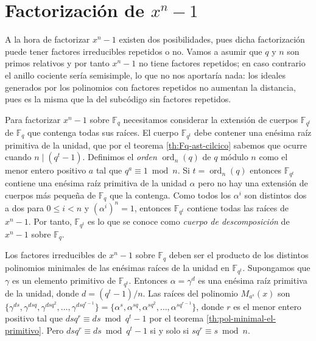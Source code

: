 \section{Factorización de \texorpdfstring{\(x^n -1\)}{xn - 1}}

\label{sec:factorizacion-xn-1}

A la hora de factorizar \(x^n -1\) existen dos posibilidades, pues dicha factorización puede tener factores irreducibles repetidos o no.
Vamos a asumir que \(q\) y \(n\) son primos relativos y por tanto \(x^n - 1\) no tiene factores repetidos; en caso contrario el anillo cociente sería semisimple, lo que no nos aportaría nada: los ideales generados por los polinomios con factores repetidos no aumentan la distancia, pues es la misma que la del subcódigo sin factores repetidos.

Para factorizar \(x^n - 1\) sobre \(\mathbb F_q\) necesitamos considerar la extensión de cuerpos \(\mathbb F_{q^t}\) de \(\mathbb F_q\) que contenga todas sus raíces.
El cuerpo \(\mathbb F_{q^t}\) debe contener una enésima raíz primitiva de la unidad, que por el teorema \ref{th:Fq-ast-cilcico} sabemos que ocurre cuando \(n \mid (q^t - 1)\).
Definimos el \textit{orden} \(\operatorname{ord}_n(q)\) de \(q\) módulo \(n\) como el menor entero positivo \(a\) tal que \(q^{a} \equiv 1 \bmod n\).
Si \(t = \operatorname{ord}_n(q)\) entonces \(\mathbb F_{q^t}\) contiene una enésima raíz primitiva de la unidad \(\alpha\) pero no hay una extensión de cuerpos más pequeña de \(\mathbb F_q\) que la contenga.
Como todos los \(\alpha^{i}\) son distintos dos a dos para \(0 \leq i < n\) y \((\alpha^{i})^n = 1\), entonces \(\mathbb F_{q^t}\) contiene todas las raíces de \(x^n - 1\).
Por tanto, \(\mathbb F_{q^t}\) es lo que se conoce como \textit{cuerpo de descomposición} de \(x^n - 1\) sobre \(\mathbb F_q\).

Los factores irreducibles de \(x^n - 1\) sobre \(\mathbb F_q\) deben ser el producto de los distintos polinomios minimales de las enésimas raíces de la unidad en \(\mathbb F_{q^t}\).
Supongamos que \(\gamma\) es un elemento primitivo de \(\mathbb F_{q^t}\).
Entonces \(\alpha = \gamma^d\) es una enésima raíz primitiva de la unidad, donde \(d = (q^t - 1)/n\).
Las raíces del polinomio \(M_{a^s}(x)\) son \(\{\gamma^{ds}, \gamma^{dsq}, \gamma^{dsq^2}, \dots, \gamma^{dsq^{r-1}}\} = \{\alpha^s, \alpha^{sq}, \alpha^{sq^2}, \dots, \alpha^{sq^{r-1}}\}\), donde \(r\) es el menor entero positivo tal que \(dsq^r \equiv ds \bmod q^t - 1\) por el teorema \ref{th:pol-minimal-el-primitivo}.
Pero \(dsq^r \equiv ds \bmod q^t - 1\) si y solo si \(sq^r \equiv s \bmod n\).

